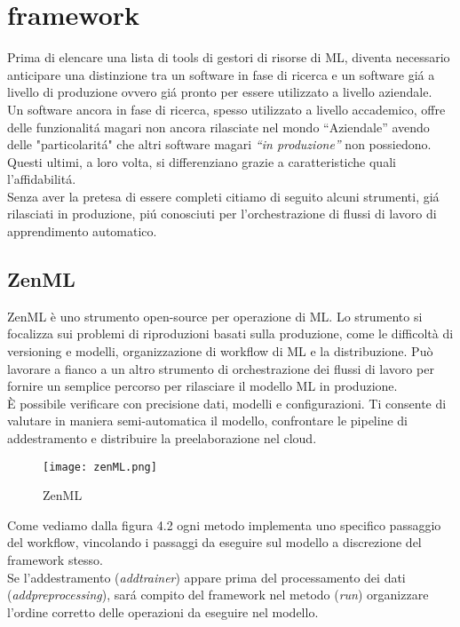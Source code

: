 \documentclass[../tesi.tex]{subfiles}
\begin{document}
\section{\Gls{framework}}
  Prima di elencare una lista di tools di gestori di risorse di ML, diventa necessario anticipare una distinzione tra un software in fase di ricerca e un software giá a livello di produzione ovvero giá pronto per essere utilizzato a livello aziendale.\\
  Un software ancora in fase di ricerca, spesso utilizzato a livello accademico, offre delle funzionalitá magari non ancora rilasciate nel mondo ``Aziendale'' avendo delle "particolaritá" che altri software magari \textit{``in produzione''} non possiedono.\\
  Questi ultimi, a loro volta, si differenziano grazie a caratteristiche quali l'affidabilitá.\\
  Senza aver la pretesa di essere completi citiamo di seguito alcuni strumenti, giá rilasciati in produzione, piú conosciuti per l'orchestrazione di flussi di lavoro di apprendimento automatico.

  \newpage
  \subsection{ZenML} 
  ZenML è uno strumento open-source per operazione di ML.
  Lo strumento si focalizza sui problemi di riproduzioni basati sulla produzione, come le difficoltà di versioning e modelli, organizzazione di workflow di ML e la distribuzione. Può lavorare a fianco a un altro strumento di orchestrazione dei flussi di lavoro per fornire un semplice percorso per rilasciare il modello ML in produzione.\\
  È possibile verificare con precisione dati, modelli e configurazioni. Ti consente di valutare in maniera semi-automatica il modello, confrontare le pipeline di addestramento e distribuire la preelaborazione nel cloud.
  
\begin{figure}[htbp]
\centering
\texttt{[image: zenML.png]} 
\caption{ZenML}
\end{figure}
  Come vediamo dalla figura 4.2 ogni metodo implementa uno specifico passaggio del workflow, vincolando i passaggi da eseguire sul modello a discrezione del \Gls{framework} stesso.\\
  Se l'addestramento (\textit{add\textunderscore trainer}) appare prima del processamento dei dati (\textit{add\textunderscore preprocessing}), sará compito del framework nel metodo (\textit{run}) organizzare l'ordine corretto delle operazioni da eseguire nel modello.
  \newpage
\end{document}

